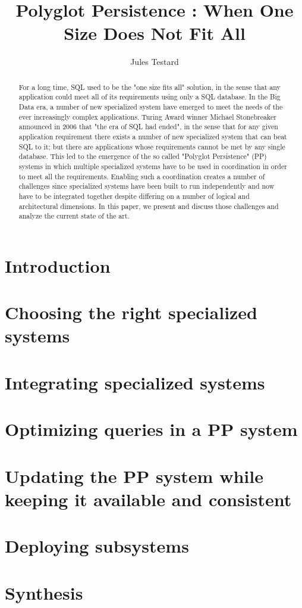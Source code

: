 \documentclass[11pt]{article}
\begin{document}
\title{Polyglot Persistence : When One Size Does Not Fit All}
\author{Jules Testard}
\maketitle

\begin{abstract}
For a long time, SQL used to be the "one size fits all" solution, in the sense that any application could meet all of its requirements using only a SQL database. In the Big Data era, a number of new specialized system have emerged to meet the needs of the ever increasingly complex applications. Turing Award winner Michael Stonebreaker announced in 2006 that "the era of SQL had ended", in the sense that for any given application requirement there exists a number of new specialized system that can beat SQL to it; but there are applications whose requirements cannot be met by any single database. This led to the emergence of the so called "Polyglot Persistence" (PP) systems in which multiple specialized systems have to be used in coordination in order to meet all the requirements. Enabling such a coordination creates a number of challenges since specialized systems have been built to run independently and now have to be integrated together despite differing on a number of logical and architectural dimensions. In this paper, we present and discuss those challenges and analyze the current state of the art.
\end{abstract}

\section{Introduction}



\section{Choosing the right specialized systems}



\section{Integrating specialized systems}



\section{Optimizing queries in a PP system}



\section{Updating the PP system while keeping it available and consistent}



\section{Deploying subsystems}



\section{Synthesis}

{}

\end{document}
